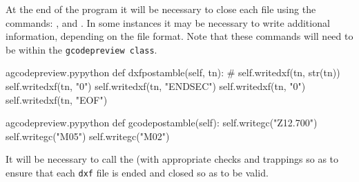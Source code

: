 \documentclass{ltxdoc}
\begin{document}
At the end of the program it will be necessary to close each file using the commands: 
, and
. %
In some instances it may be necessary to write additional information, depending on the file format. Note that these commands will need to be within the \verb|gcodepreview class|.
 
\lstset{firstnumber=\thegcpy}
\begin{writecode}{a}{gcodepreview.py}{python}
    def dxfpostamble(self, tn):
#        self.writedxf(tn, str(tn))
        self.writedxf(tn, "0")
        self.writedxf(tn, "ENDSEC")
        self.writedxf(tn, "0")
        self.writedxf(tn, "EOF")
        
\end{writecode}
\addtocounter{gcpy}{7}

\lstset{firstnumber=\thegcpy}
\begin{writecode}{a}{gcodepreview.py}{python}
    def gcodepostamble(self):
        self.writegc("Z12.700")
        self.writegc("M05")
        self.writegc("M02")
        
\end{writecode}
\addtocounter{gcpy}{5}

It will be necessary to call the  (with appropriate checks and trappings so as to ensure that each \verb|dxf| file is ended and closed so as to be valid.
 
\end{document}
